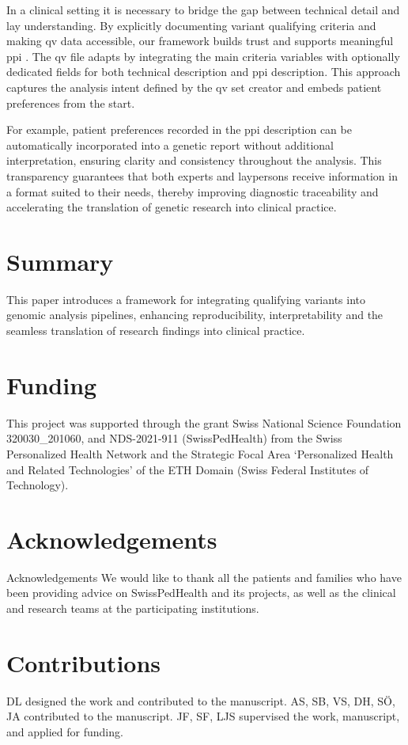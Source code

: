 In a clinical setting it is necessary to bridge the gap between technical detail and lay understanding. By explicitly documenting variant qualifying criteria and making \ac{qv} data accessible, our framework builds trust and supports meaningful \ac{ppi} \cite{morris_answer_2011}. The \ac{qv} file adapts by integrating the main criteria variables with optionally dedicated fields for both technical description and \ac{ppi} description. This approach captures the analysis intent defined by the \ac{qv} set creator and embeds patient preferences from the start. 

For example, patient preferences recorded in the \ac{ppi} description can be automatically incorporated into a genetic report without additional interpretation, ensuring clarity and consistency throughout the analysis. This transparency guarantees that both experts and laypersons receive information in a format suited to their needs, thereby improving diagnostic traceability and accelerating the translation of genetic research into clinical practice.

\FloatBarrier

\section{Summary}
This paper introduces a framework for integrating qualifying variants into genomic analysis pipelines, enhancing reproducibility, interpretability and the seamless translation of research findings into clinical practice.

\section{Funding}
This project was supported through the grant Swiss National Science Foundation  320030\_201060, and NDS-2021-911 (SwissPedHealth) from the Swiss Personalized Health Network and the Strategic Focal Area `Personalized Health and Related Technologies' of the ETH Domain (Swiss Federal Institutes of Technology).

\section{Acknowledgements}
Acknowledgements We would like to thank all the patients and families who have been providing advice on SwissPedHealth and its projects, as well as the clinical and research teams at the participating institutions.

\section{Contributions}
DL designed the work and contributed to the manuscript.
AS, SB, VS, DH, SÖ, JA contributed to the manuscript.
JF, SF, LJS supervised the work, manuscript, and applied for funding.

